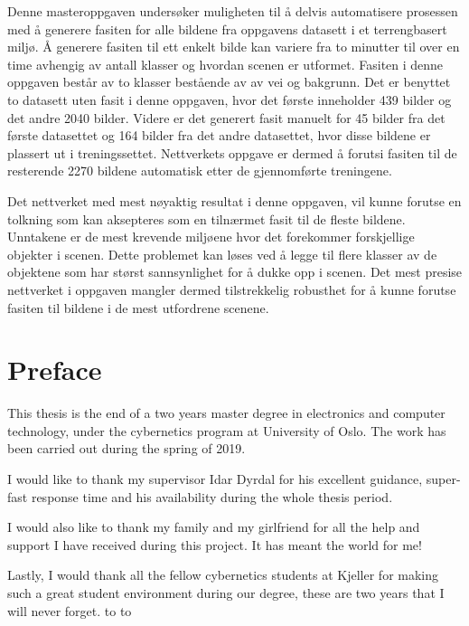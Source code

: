 \documentclass[USenglish]{ifimaster}  %
\def\sig#1{\vbox{\hsize=5.5cm
    \kern2cm\hrule\kern1ex
    \hbox to \hsize{\strut\hfil #1 \hfil}}}
\newcommand\signatures[2]{%
\hbox to \hsize{\hfil #1, \today\hfil}
\hbox to \hsize{\hfil\sig{#2}\hfil}
}
\begin{document}
Denne masteroppgaven undersøker muligheten til å delvis automatisere prosessen med å generere fasiten for alle bildene fra oppgavens datasett i et terrengbasert miljø. Å generere fasiten til ett enkelt bilde kan variere fra to minutter til over en time avhengig av antall klasser og hvordan scenen er utformet. Fasiten i denne oppgaven består av to klasser bestående av av vei og bakgrunn. Det er benyttet to datasett uten fasit i denne oppgaven, hvor det første inneholder 439 bilder og det andre 2040 bilder. Videre er det generert fasit manuelt for 45 bilder fra det første datasettet og 164 bilder fra det andre datasettet, hvor disse bildene er plassert ut i treningssettet. Nettverkets oppgave er dermed å forutsi fasiten til de resterende 2270 bildene automatisk etter de gjennomførte treningene.   

Det nettverket med mest nøyaktig resultat i denne oppgaven, vil kunne forutse en tolkning som kan aksepteres som en tilnærmet fasit til de fleste bildene. Unntakene er de mest krevende miljøene hvor det forekommer forskjellige objekter i scenen. Dette problemet kan løses ved å legge til flere klasser av de objektene som har størst sannsynlighet for å dukke opp i scenen. Det mest presise nettverket i oppgaven mangler dermed tilstrekkelig robusthet for å kunne forutse fasiten til bildene i de mest utfordrene scenene. 

\chapter*{Preface}
This thesis is the end of a two years master degree in electronics and computer technology, under the cybernetics program at University of Oslo. The work has been carried out during the spring of 2019.

I would like to thank my supervisor Idar Dyrdal for his excellent guidance, super-fast response time and his availability during the whole thesis period. 

I would also like to thank my family and my girlfriend for all the help and support I have received during this project. It has meant the world for me!

Lastly, I would thank all the fellow cybernetics students at Kjeller for making such a great student environment during our degree, these are two years that I will never forget.
\newline
\newline
\newline
\newline
\signatures{Kjeller}{Andreas Hagen}
\end{document}
